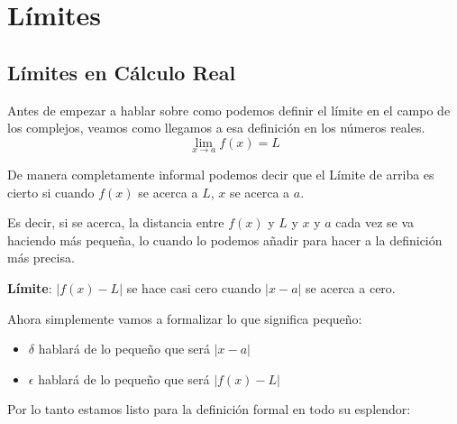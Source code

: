\documentclass[12pt, fleqn]{report}                             %
\begin{document}
    \chapter{Límites}
        \clearpage

        \clearpage
        \section{Límites en Cálculo Real}

            Antes de empezar a hablar sobre como podemos definir el límite en el campo de
            los complejos, veamos como llegamos a esa definición en los números reales.
            \begin{equation}
                \lim_{x \to a} f(x) = L
            \end{equation}

            De manera completamente informal podemos decir que el Límite de arriba es cierto
            si cuando $f(x)$ se acerca a $L$, $x$ se acerca a $a$. 

            Es decir, si se acerca, la distancia entre $f(x)$ y $L$ y $x$ y $a$ cada vez 
            se va haciendo más pequeña, lo cuando lo podemos añadir para hacer a la definición
            más precisa.

            \textbf{Límite}: $|f(x)-L|$ se hace casi cero cuando $|x-a|$ se acerca a cero.

            Ahora simplemente vamos a formalizar lo que significa pequeño:
            \begin{itemize}
                 \item $\delta$ hablará de lo pequeño que será $|x-a|$
                 \item $\epsilon$ hablará de lo pequeño que será $|f(x)-L|$
             \end{itemize} 

            Por lo tanto estamos listo para la definición formal en todo su esplendor:


\end{document}
